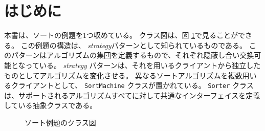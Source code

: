 \documentclass[\pformat,12pt]{jarticle}
\begin{document}

\section{はじめに}

本書は、ソートの例題を1つ収めている。
クラス図は、図 \ref{inh}で見ることができる。
この例題の構造は、 \textit{strategy}パターンとして知られているものである。
このパターンはアルゴリズムの集団を定義するもので、それぞれ隠蔽し合い交換可能となっている。
\textit{strategy} パターンは、それを用いるクライアントから独立したものとしてアルゴリズムを変化させる。
異なるソートアルゴリズムを複数用いるクライアントとして、 \texttt{SortMachine} クラスが置かれている。
 \texttt{Sorter} クラスは、サポートされるアルゴリズムすべてに対して共通なインターフェイスを定義している抽象クラスである。


\begin{figure}[tbh]
\begin{center}
\mbox{}
\caption{ソート例題のクラス図}\label{inh}
\end{center}
\end{figure}

\newpage


\newpage


\newpage


\newpage
 

\newpage


\newpage


%
%
%
%
%
%
%
%
%
%
%

\newpage
{}
\printindex
\end{document}
